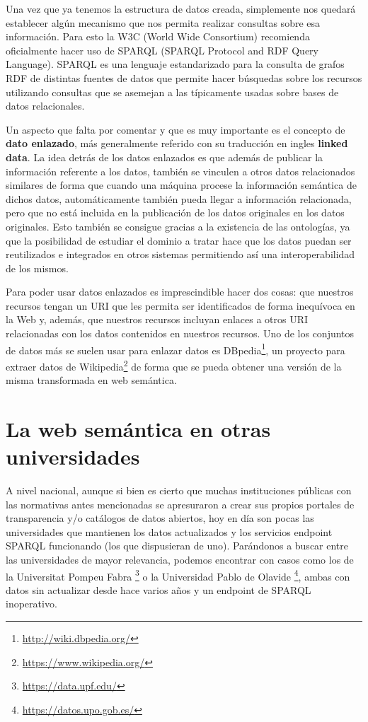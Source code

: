 \bigskip
Una vez que ya tenemos la estructura de datos creada, simplemente nos quedará establecer algún mecanismo que nos permita realizar consultas sobre esa información. Para esto la {\sf W3C (World Wide Consortium)} recomienda oficialmente hacer uso de {\sf SPARQL (SPARQL Protocol and RDF Query Language)}. {\sf SPARQL} es una lenguaje estandarizado para la consulta de grafos {\sf RDF} de distintas fuentes de datos que permite hacer búsquedas sobre los recursos utilizando consultas que se asemejan a las típicamente usadas sobre bases de datos relacionales.

\bigskip

Un aspecto que falta por comentar y que es muy importante es el concepto de \textbf{dato enlazado}, más generalmente referido con su traducción en ingles \textbf{linked data}. La idea detrás de los datos enlazados es que además de publicar la información referente a los datos, también se vinculen a otros datos relacionados similares de forma que cuando una máquina procese la información semántica de dichos datos, automáticamente también pueda llegar a información relacionada, pero que no está incluida en la publicación de los datos originales en los datos originales. Esto también se consigue gracias a la existencia de las ontologías, ya que la posibilidad de estudiar el dominio a tratar hace que los datos puedan ser reutilizados e integrados en otros sistemas permitiendo así una interoperabilidad de los mismos.

\bigskip
Para poder usar datos enlazados es imprescindible hacer dos cosas: que nuestros recursos tengan un {\sf URI} que les permita ser identificados de forma inequívoca en {\sf la Web} y, además, que nuestros recursos incluyan enlaces a otros {URI} relacionadas con los datos contenidos en nuestros recursos. Uno de los conjuntos de datos más se suelen usar para enlazar datos es {\sf DBpedia\footnote{\url{http://wiki.dbpedia.org/}}}, un proyecto para extraer datos de {\sf Wikipedia\footnote{\url{https://www.wikipedia.org/}}} de forma que se pueda obtener una versión de la misma transformada en web semántica.

\newpage
\section{La web semántica en otras universidades}

A nivel nacional, aunque si bien es cierto que muchas instituciones públicas con las normativas antes mencionadas se apresuraron a crear sus propios portales de transparencia y/o catálogos de datos abiertos, hoy en día son pocas las universidades que mantienen los datos actualizados y los servicios endpoint {\sf SPARQL} funcionando (los que dispusieran de uno). Parándonos a buscar entre las universidades de mayor relevancia, podemos encontrar con casos como los de la {\sf Universitat Pompeu Fabra} \footnote{\url{https://data.upf.edu/}} o la {\sf Universidad Pablo de Olavide} \footnote{\url{https://datos.upo.gob.es/}}, ambas con datos sin actualizar desde hace varios años y un endpoint de {\sf SPARQL} inoperativo.

